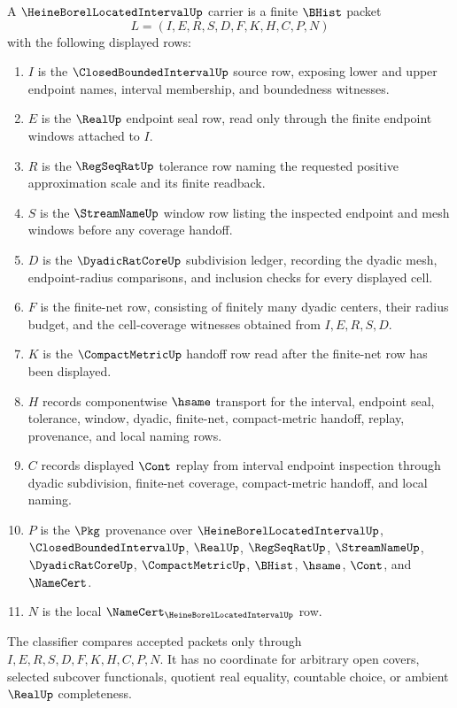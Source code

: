\begin{definition}
\label{def:heine-borel-located-interval-carrier}
A $\HeineBorelLocatedIntervalUp$ carrier is a finite $\BHist$ packet
$$
L=(I,E,R,S,D,F,K,H,C,P,N)
$$
with the following displayed rows:
\begin{enumerate}
\item $I$ is the $\ClosedBoundedIntervalUp$ source row, exposing lower and upper endpoint names, interval membership, and boundedness witnesses.
\item $E$ is the $\RealUp$ endpoint seal row, read only through the finite endpoint windows attached to $I$.
\item $R$ is the $\RegSeqRatUp$ tolerance row naming the requested positive approximation scale and its finite readback.
\item $S$ is the $\StreamNameUp$ window row listing the inspected endpoint and mesh windows before any coverage handoff.
\item $D$ is the $\DyadicRatCoreUp$ subdivision ledger, recording the dyadic mesh, endpoint-radius comparisons, and inclusion checks for every displayed cell.
\item $F$ is the finite-net row, consisting of finitely many dyadic centers, their radius budget, and the cell-coverage witnesses obtained from $I,E,R,S,D$.
\item $K$ is the $\CompactMetricUp$ handoff row read after the finite-net row has been displayed.
\item $H$ records componentwise $\hsame$ transport for the interval, endpoint seal, tolerance, window, dyadic, finite-net, compact-metric handoff, replay, provenance, and local naming rows.
\item $C$ records displayed $\Cont$ replay from interval endpoint inspection through dyadic subdivision, finite-net coverage, compact-metric handoff, and local naming.
\item $P$ is the $\Pkg$ provenance over $\HeineBorelLocatedIntervalUp$, $\ClosedBoundedIntervalUp$, $\RealUp$, $\RegSeqRatUp$, $\StreamNameUp$, $\DyadicRatCoreUp$, $\CompactMetricUp$, $\BHist$, $\hsame$, $\Cont$, and $\NameCert$.
\item $N$ is the local $\NameCert_{\HeineBorelLocatedIntervalUp}$ row.
\end{enumerate}
The classifier compares accepted packets only through $I,E,R,S,D,F,K,H,C,P,N$. It has no coordinate for arbitrary open covers, selected subcover functionals, quotient real equality, countable choice, or ambient $\RealUp$ completeness.
\end{definition}


